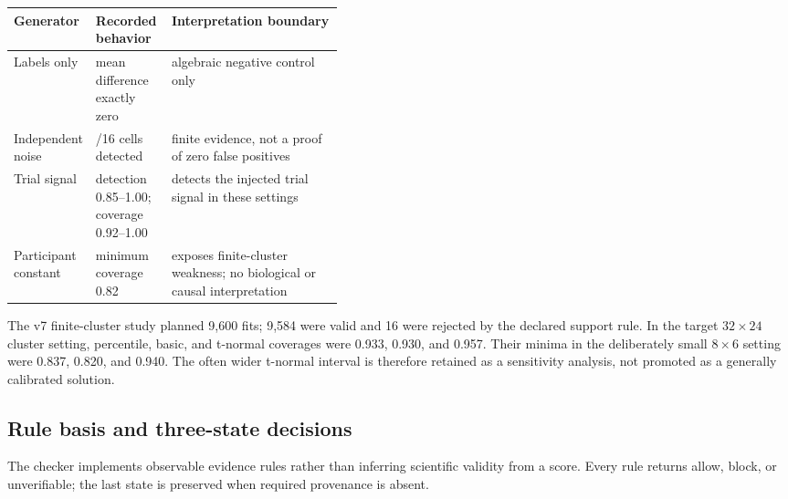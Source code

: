 \begin{center}
\small\setlength{\tabcolsep}{4pt}
\begin{tabularx}{\linewidth}{>{\raggedright\arraybackslash}p{0.19\linewidth}>{\raggedright\arraybackslash}p{0.23\linewidth}>{\raggedright\arraybackslash}X}
\toprule
Generator & Recorded behavior & Interpretation boundary \\
\midrule
Labels only & mean difference exactly zero & algebraic negative control only \\
Independent noise & 0/16 cells detected & finite evidence, not a proof of zero false positives \\
Trial signal & detection 0.85--1.00; coverage 0.92--1.00 & detects the injected trial signal in these settings \\
Participant constant & minimum coverage 0.82 & exposes finite-cluster weakness; no biological or causal interpretation \\
\bottomrule
\end{tabularx}
\end{center}

The v7 finite-cluster study planned 9,600 fits; 9,584 were valid and 16 were
rejected by the declared support rule. In the target $32\times24$ cluster
setting, percentile, basic, and t-normal coverages were 0.933, 0.930, and
0.957. Their minima in the deliberately small $8\times6$ setting were 0.837,
0.820, and 0.940. The often wider t-normal interval is therefore retained as
a sensitivity analysis, not promoted as a generally calibrated solution.

\subsection{Rule basis and three-state decisions}
The checker implements observable evidence rules rather than inferring
scientific validity from a score. Every rule returns allow, block, or
unverifiable; the last state is preserved when required provenance is absent.

